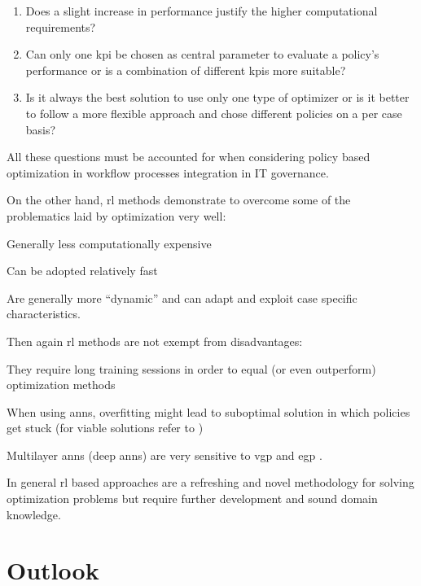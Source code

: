 \documentclass{seal_thesis}
\begin{document}
\begin{enumerate}[label=\textbf{Q. \arabic*}]
	\item Does a slight increase in performance justify the higher computational requirements?
	\item Can only one \gls{kpi} be chosen as central parameter to evaluate a policy's performance or is a combination of different \glspl{kpi} more suitable?
	\item Is it always the best solution to use only one type of optimizer or is it better to follow a more flexible approach and chose different policies on a per case basis?
\end{enumerate}

All these questions must be accounted for when considering policy based optimization in workflow processes integration in IT governance.

On the other hand, \gls{rl} methods demonstrate to overcome some of the problematics laid by optimization very well:
\begin{enumerate*}
	\item Generally less computationally expensive
	\item Can be adopted relatively fast
	\item Are generally more ``dynamic'' and can adapt and exploit case specific characteristics.
\end{enumerate*}

Then again \gls{rl} methods are not exempt from disadvantages:
\begin{enumerate*}
	\item They require long training sessions in order to equal (or even outperform) optimization methods
	\item When using \glspl{ann}, overfitting might lead to suboptimal solution in which policies get stuck (for viable solutions refer to \cite{Srivastava2014})
	\item Multilayer \glspl{ann} (\ie deep \glspl{ann}) are very sensitive to \gls{vgp} and \gls{egp} \cite{Bengio1994,Pascanu2012}.
\end{enumerate*}

In general \gls{rl} based approaches are a refreshing and novel methodology for solving optimization problems but require further development and sound domain knowledge.

\section{Outlook}
\end{document}
